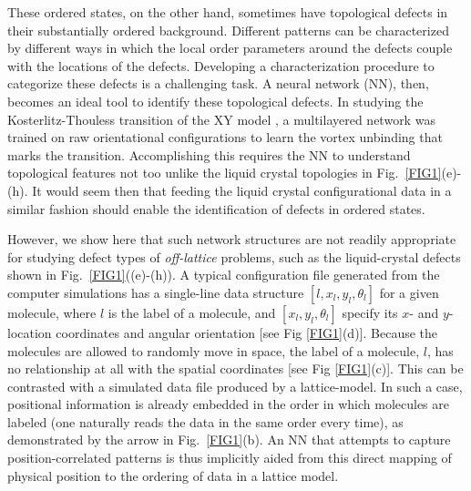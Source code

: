 These ordered states, on the other hand, sometimes have topological defects in their substantially ordered background. Different patterns can be characterized by different ways in which the local order parameters around the defects couple with the locations of the defects. Developing a characterization procedure to categorize these defects is a challenging task. A neural network (NN), then, becomes an ideal tool to identify these topological defects.
In studying the Kosterlitz-Thouless transition of the XY model \cite{beach}, a multilayered  network was trained on raw orientational configurations to learn the vortex unbinding that marks the transition. Accomplishing this requires the NN to understand topological features not too unlike the liquid crystal topologies in Fig.\ \ref{FIG1}(e)-(h). It would seem then that feeding the liquid crystal configurational data in a similar fashion should enable the identification of defects in ordered states.

However, we show here that such network structures are not readily appropriate for studying defect types of {\emph{off-lattice}} problems, such as the liquid-crystal defects shown in Fig.\ \ref{FIG1}((e)-(h)).
A typical configuration file generated from the computer simulations has a single-line data structure $[l,x_l,y_l,\theta_l]$ for a given molecule, where $l$ is the label of a molecule, and $[x_l,y_l, \theta_l]$ specify its $x$- and $y$- location coordinates and angular orientation [see Fig \ref{FIG1}(d)].
Because the molecules are allowed to randomly move in space, the label of a molecule, $l$, has no relationship at all with the spatial coordinates [see Fig \ref{FIG1}(c)].
This can be contrasted with a simulated data file produced by a lattice-model. In such a case, positional information is already embedded in the order in which molecules are labeled (one naturally reads the data in the same order every time), as demonstrated by the arrow in Fig.\ \ref{FIG1}(b).
An NN that attempts to capture position-correlated patterns is thus implicitly aided from this direct mapping of physical position to the ordering of data in a lattice model.

